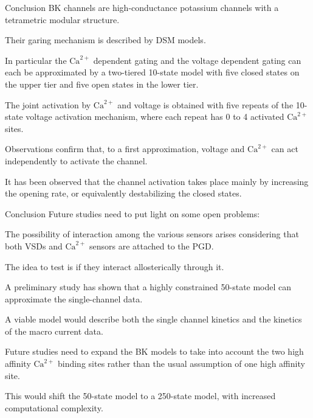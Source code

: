 \documentclass[t]{beamer}
\newcommand{\ca}{\text{Ca}^{2+}}
\begin{document}

\begin{frame}{Conclusion}
BK channels are high-conductance potassium channels with a tetrametric modular structure.

Their garing mechanism is described by DSM models.

In particular the $\ca$ dependent gating and the voltage dependent gating can each be approximated by a two-tiered 10-state model with five closed states on the upper tier and five open states in the lower tier.

The joint activation by $\ca$ and voltage is obtained with five repeats of the 10-state voltage activation mechanism, where each repeat has 0 to 4 activated $\ca$ sites.

Observations confirm that, to a first approximation, voltage and $\ca$ can act independently to activate the channel.

It has been observed that the channel activation takes place mainly by increasing the opening rate, or equivalently destabilizing the closed states.


\end{frame}

\begin{frame}{Conclusion}
Future studies need to put light on some open problems:

The possibility of interaction among the various sensors arises considering that both VSDs and $\ca$ sensors are attached to the PGD.

The idea to test is if they interact allosterically through it.

A preliminary study has shown that a highly constrained 50-state model can approximate the single-channel data.

A viable model would describe both the single channel kinetics and the kinetics of the macro current data.

Future studies need to expand the BK models to take into account the two high affinity $\ca$ binding sites rather than the usual assumption of one high affinity site.

This would shift the 50-state model to a 250-state model, with increased computational complexity.
\end{frame}
\end{document}
